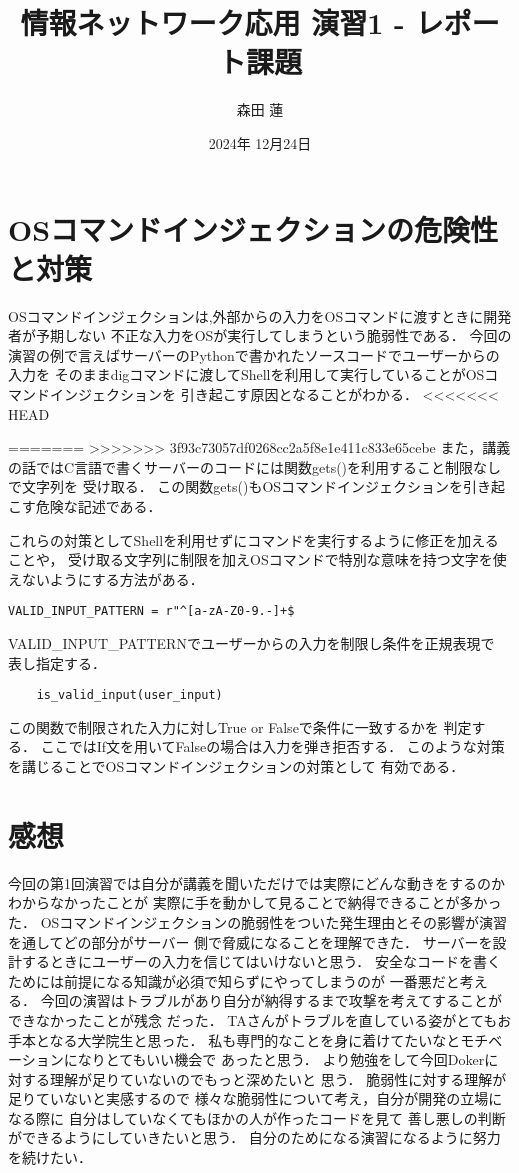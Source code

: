 \documentclass{jlreq}
\title{情報ネットワーク応用 演習1 - レポート課題}
\author{森田 蓮}
\date{2024年 12月24日}
\begin{document}
\maketitle

\section{OSコマンドインジェクションの危険性と対策}
OSコマンドインジェクションは,外部からの入力をOSコマンドに渡すときに開発者が予期しない
不正な入力をOSが実行してしまうという脆弱性である．
今回の演習の例で言えばサーバーのPythonで書かれたソースコードでユーザーからの入力を
そのままdigコマンドに渡してShellを利用して実行していることがOSコマンドインジェクションを
引き起こす原因となることがわかる．
<<<<<<< HEAD

=======
>>>>>>> 3f93c73057df0268cc2a5f8e1e411c833e65cebe
また，講義の話ではC言語で書くサーバーのコードには関数gets()を利用すること制限なしで文字列を
受け取る．
この関数gets()もOSコマンドインジェクションを引き起こす危険な記述である．

これらの対策としてShellを利用せずにコマンドを実行するように修正を加えることや，
受け取る文字列に制限を加えOSコマンドで特別な意味を持つ文字を使えないようにする方法がある．

\begin{verbatim}
VALID_INPUT_PATTERN = r"^[a-zA-Z0-9.-]+$
\end{verbatim}

VALID_INPUT_PATTERNでユーザーからの入力を制限し条件を正規表現で
表し指定する．

\begin{verbatim}
    is_valid_input(user_input)
\end{verbatim}

この関数で制限された入力に対しTrue or Falseで条件に一致するかを
判定する．
ここではIf文を用いてFalseの場合は入力を弾き拒否する．
このような対策を講じることでOSコマンドインジェクションの対策として
有効である．



\section{感想}
今回の第1回演習では自分が講義を聞いただけでは実際にどんな動きをするのかわからなかったことが
実際に手を動かして見ることで納得できることが多かった．
OSコマンドインジェクションの脆弱性をついた発生理由とその影響が演習を通してどの部分がサーバー
側で脅威になることを理解できた．
サーバーを設計するときにユーザーの入力を信じてはいけないと思う．
安全なコードを書くためには前提になる知識が必須で知らずにやってしまうのが
一番悪だと考える．
今回の演習はトラブルがあり自分が納得するまで攻撃を考えてすることができなかったことが残念
だった．
TAさんがトラブルを直している姿がとてもお手本となる大学院生と思った．
私も専門的なことを身に着けてたいなとモチベーションになりとてもいい機会で
あったと思う．
より勉強をして今回Dokerに対する理解が足りていないのでもっと深めたいと
思う．
脆弱性に対する理解が足りていないと実感するので
様々な脆弱性について考え，自分が開発の立場になる際に
自分はしていなくてもほかの人が作ったコードを見て
善し悪しの判断ができるようにしていきたいと思う．
自分のためになる演習になるように努力を続けたい．
\end{document}
